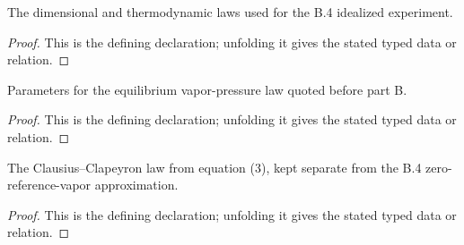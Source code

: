 \begin{definition}[DryAirWaterVaporExperiment]
  \label{decl:physics:IPhO_2026_4_B_4:DryAirWaterVaporExperiment}
  The dimensional and thermodynamic laws used for the B.4 idealized experiment.
\end{definition}
\begin{proof}
  This is the defining declaration; unfolding it gives the stated typed data or relation.
\end{proof}

\begin{definition}[ClausiusClapeyronData]
  \label{decl:physics:IPhO_2026_4_B_4:ClausiusClapeyronData}
  Parameters for the equilibrium vapor-pressure law quoted before part B.
\end{definition}
\begin{proof}
  This is the defining declaration; unfolding it gives the stated typed data or relation.
\end{proof}

\begin{definition}[SatisfiesClausiusClapeyron]
  \label{decl:physics:IPhO_2026_4_B_4:SatisfiesClausiusClapeyron}
  The Clausius--Clapeyron law from equation (3), kept separate from the B.4 zero-reference-vapor approximation.
\end{definition}
\begin{proof}
  This is the defining declaration; unfolding it gives the stated typed data or relation.
\end{proof}

